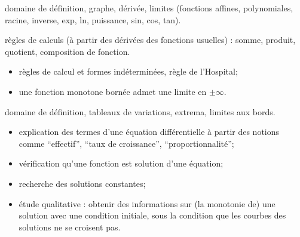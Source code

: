 %
%



     domaine de définition, graphe, dérivée, limites (fonctions affines, polynomiales, racine, inverse, exp, ln, puissance, sin, cos, tan).

     règles de calculs (à partir des dérivées des fonctions usuelles) : somme, produit, quotient, composition de fonction.


    \begin{itemize}
        \item règles de calcul et formes indéterminées, règle de l'Hospital;

        \item une fonction monotone bornée admet une limite en $\pm \infty$.
    \end{itemize}

     domaine de définition, tableaux de variations, extrema, limites aux bords.

    \begin{itemize}
        \item explication des termes d'une équation différentielle à partir des notions comme \enquote{effectif}, \enquote{taux de croissance}, \enquote{proportionnalité};

        \item vérification qu'une fonction est solution d'une équation;

        \item recherche des solutions constantes;

        \item étude qualitative : obtenir des informations sur (la monotonie de) une solution avec une condition initiale, sous la condition que les courbes des solutions ne se croisent pas.
    \end{itemize}


